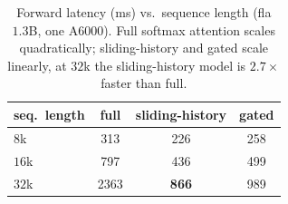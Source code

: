 \begin{table}[t]
\centering
\small
\begin{tabular}{lccc}
\toprule
seq.\ length & full & sliding-history & gated \\
\midrule
$8$k & 313 & 226 & 258 \\
$16$k & 797 & 436 & 499 \\
$32$k & 2363 & \textbf{866} & 989 \\
\bottomrule
\end{tabular}
\caption{Forward latency (ms) vs.\ sequence length (fla $1.3$B, one A6000). Full softmax attention scales quadratically; sliding-history and gated scale linearly, at $32$k the sliding-history model is $2.7\times$ faster than full.}
\label{tab:eff}
\end{table}
